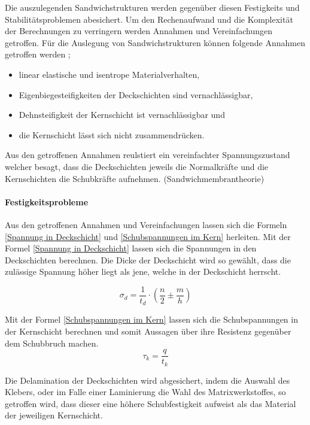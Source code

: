   Die auszulegenden Sandwichstrukturen werden gegenüber diesen Festigkeits und Stabilitätsproblemen abesichert. Um den Rechenaufwand und die Komplexität der Berechnungen zu verringern werden Annahmen und Vereinfachungen getroffen. Für die Auslegung von Sandwichstrukturen können folgende Annahmen getroffen werden \cite{klein}\cite{ETH};
  \begin{itemize}
    \item linear elastische und isentrope Materialverhalten,
    \item Eigenbiegesteifigkeiten der Deckschichten sind vernachlässigbar,
    \item Dehnsteifigkeit der Kernschicht ist vernachlässigbar und
    \item die Kernschicht lässt sich nicht zusammendrücken.
  \end{itemize}
  Aus den getroffenen Annahmen reulstiert ein vereinfachter Spannungszustand welcher besagt, dass die Deckschichten jeweils die Normalkräfte und die Kernschichten die Schubkräfte aufnehmen. (Sandwichmembrantheorie)

    \paragraph{Festigkeitsprobleme}
    Aus den getroffenen Annahmen und Vereinfachungen lassen sich die Formeln \ref{Spannung in Deckschicht} und \ref{Schubspannungen im Kern} herleiten. Mit der Formel \ref{Spannung in Deckschicht} lassen sich die Spannungen in den Deckschichten berechnen. Die Dicke der Deckschicht wird so gewählt, dass die zulässige Spannung höher liegt als jene, welche in der Deckschicht herrscht.

    \begin{equation}
      \label{Spannung in Deckschicht}
      \sigma_d = \frac{1}{t_d}\cdot \left ( \frac{n}{2} \pm \frac{m}{h}\right )
    \end{equation}

    Mit der Formel \ref{Schubspannungen im Kern} lassen sich die Schubspannungen in der Kernschicht berechnen und somit Aussagen über ihre Resistenz gegenüber dem Schubbruch machen.
    \begin{equation}
      \label{Schubspannungen im Kern}
      \tau_k = \frac{q}{t_k}
    \end{equation}

    Die Delamination der Deckschichten wird abgesichert, indem die Auswahl des Klebers, oder im Falle einer Laminierung die Wahl des Matrixwerkstoffes, so getroffen wird, dass dieser eine höhere Schubfestigkeit aufweist als das Material der jeweiligen Kernschicht.

